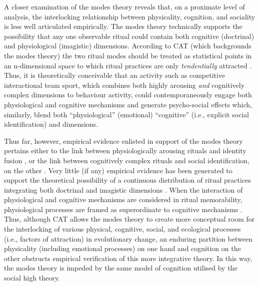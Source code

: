 \begin{CJK}{UTF8}{gbsn}
A closer examination of the modes theory reveals that, on a proximate level of analysis, the interlocking relationship between physicality, cognition, and sociality is less well articulated empirically.  The modes theory technically supports the possibility that any one observable ritual could contain both cognitive (doctrinal) and physiological (imagistic) dimensions.  According to CAT (which backgrounds the modes theory) the two ritual modes should be treated as statistical points in an n-dimensional space to which ritual practices are only \textit{tendentially} attracted \citep{Atkinson2011,Whitehouse2014a,Scott-Phillips2017}.  Thus, it is theoretically conceivable that an activity such as competitive interactional team sport, which combines both highly arousing \textit{and} cognitively complex dimensions to behaviour activity,  could contemporaneously engage both physiological and cognitive mechanisms and generate psycho-social effects which, similarly, blend both ``physiological'' (emotional) ``cognitive'' (i.e., explicit social identification) and dimensions.

Thus far, however, empirical evidence enlisted in support of the modes theory pertains either to the link between physiologically arousing rituals and identity fusion \citep{Whitehouse2005}, or the link between cognitively complex rituals and social identification, on the other \citep{Whitehouse2014,Whitehouse2017,Swann2010a,Richert2005}.  Very little (if any) empirical evidence has been generated to support the theoretical possibility of a continuous distribution of ritual practices integrating both doctrinal and imagistic dimensions \citep{Atran2010}.  When the interaction of physiological and cognitive mechanisms are considered in ritual memorability, physiological processes are framed as superordinate to cognitive mechanisms \citep[see][]{Russell2014}.  Thus, although CAT allows the modes theory to create more conceptual room for the interlocking of various physical, cognitive, social, and ecological processes (i.e., factors of attraction) in evolutionary change, an enduring partition between physicality (including emotional processes) on one hand and cognition on the other obstructs empirical verification of this more integrative theory.  In this way, the modes theory is impeded by the same model of cognition utilised by the social high theory.


\end{CJK}

